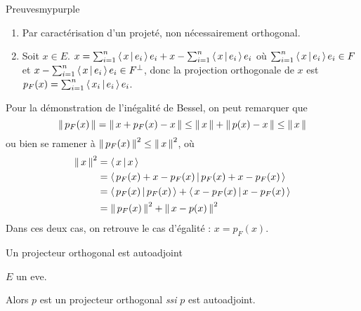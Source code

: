         \begin{demo}{Preuves}{mypurple}
            \begin{enumerate}
                \item Par caractérisation d’un projeté, non nécessairement orthogonal.
                \item Soit $x \in E$. $x = \sum_{i=1}^{n} \left<\,x\,\middle|\,e_i\,\right>e_i + x - \sum_{i=1}^{n} \left<\,x\,\middle|\,e_i\,\right>e_i$ où $\sum_{i=1}^{n} \left<\,x\,\middle|\,e_i\,\right>e_i \in F$ et $x - \sum_{i=1}^{n} \left<\,x\,\middle|\,e_i\,\right>e_i \in F^{\perp}$, donc la projection orthogonale de $x$ est $p_F(x) = \sum_{i=1}^{n} \left<\,x_i\,\middle|\,e_i\,\right> e_i$.
            \end{enumerate}
            Pour la démonstration de l’inégalité de Bessel, on peut remarquer que 
            \[ \left\lVert\,p_F(x)\,\right\rVert = \left\lVert\,x + p_F(x) - x\,\right\rVert \leq \left\lVert\,x\,\right\rVert + \left\lVert\,p(x) - x\,\right\rVert \leq \left\lVert\,x\,\right\rVert \]
            ou bien se ramener à $\left\lVert\,p_F(x)\,\right\rVert^2 \leq \left\lVert\,x\,\right\rVert^2$, où 
            \begin{align*}
                \left\lVert\,x\,\right\rVert^2 
                &= \left<\,x\,\middle|\,x\,\right> \\
                &= \left<\,p_F(x) + x - p_F(x)\,\middle|\,p_F(x) + x - p_F(x)\,\right> \\
                &= \left<\,p_F(x)\,\middle|\,p_F(x)\,\right> + \left<\,x-p_F(x)\,\middle|\,x - p_F(x)\,\right> \\
                &= \left\lVert\,p_F(x)\,\right\rVert^2 + \left\lVert\,x - p(x)\,\right\rVert^2
            \end{align*}
            Dans ces deux cas, on retrouve le cas d’égalité : $x = p_F(x)$.
        \end{demo}

        \begin{prop}{Un projecteur orthogonal est autoadjoint}{}
            \begin{soit}
                \item $E$ un eve.
            \end{soit}
            Alors $p$ est un projecteur orthogonal \textit{ssi} $p$ est autoadjoint.
        \end{prop}


